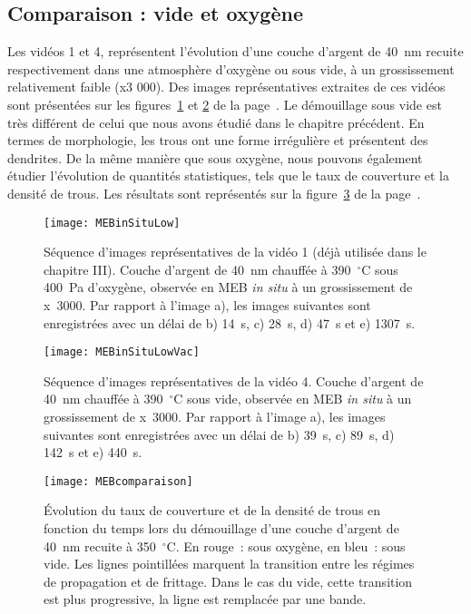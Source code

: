 \subsection{Comparaison : vide et oxygène}
Les vidéos 1 et 4, représentent l'évolution d'une couche d'argent de 40~nm recuite respectivement dans une atmosphère d'oxygène ou sous vide, à un grossissement relativement faible (x3 000). Des images représentatives extraites de ces vidéos sont présentées sur les figures~\ref{MEBinSituLowIV} et \ref{MEBinSituLowVac} de la page~\pageref{MEBinSituLowIV}. Le démouillage sous vide est très différent de celui que nous avons étudié dans le chapitre précédent. En termes de morphologie, les trous ont une forme irrégulière et présentent des dendrites. De la même manière que sous oxygène, nous pouvons également étudier l'évolution de quantités statistiques, tels que le taux de couverture et la densité de trous. Les résultats sont représentés sur la figure~\ref{MEBcomparaison} de la page~\pageref{MEBcomparaison}.\par 
\begin{figure}[!p]
\centering
\texttt{[image: MEBinSituLow]}
\caption{Séquence d'images représentatives de la vidéo 1 (déjà utilisée dans le chapitre III). Couche d'argent de 40~nm chauffée à 390~$^\circ$C sous 400~Pa d'oxygène, observée en MEB \textit{in situ} à un grossissement de x~3000. Par rapport à l'image a), les images suivantes sont enregistrées avec un délai de b) 14~s, c) 28~s, d) 47~s et e) 1307~s.}
\label{MEBinSituLowIV}
\end{figure}
\begin{figure}[!p]
\centering
\texttt{[image: MEBinSituLowVac]}
\caption{Séquence d'images représentatives de la vidéo 4. Couche d'argent de 40~nm chauffée à 390~$^\circ$C sous vide, observée en MEB \textit{in situ} à un grossissement de x~3000. Par rapport à l'image a), les images suivantes sont enregistrées avec un délai de b) 39~s, c) 89~s, d) 142~s et e) 440~s.}
\label{MEBinSituLowVac}
\end{figure}
\begin{figure}[!p]
\centering
\texttt{[image: MEBcomparaison]}
\caption{Évolution du taux de couverture et de la densité de trous en fonction du temps lors du démouillage d'une couche d'argent de 40~nm recuite à 350~$^\circ$C. En rouge~: sous oxygène, en bleu~: sous vide. Les lignes pointillées marquent la transition entre les régimes de propagation et de frittage. Dans le cas du vide, cette transition est plus progressive, la ligne est remplacée par une bande.}
\label{MEBcomparaison}
\end{figure}
